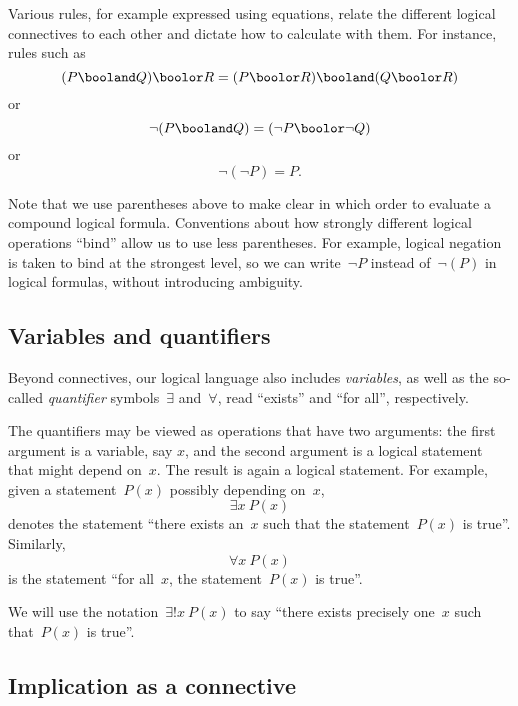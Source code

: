 Various rules, for example expressed using equations, relate the different logical connectives to each other and dictate how to calculate with them.
For instance, rules such as
\begin{equation*}
    (P \booland Q) \boolor R = (P \boolor R) \booland (Q \boolor R)
\end{equation*}
or 
\begin{equation*}
     \lnot (P \booland Q)  = (\lnot P \boolor \lnot Q)
\end{equation*}
or 
\begin{equation*}
    \lnot (\lnot P) = P.
\end{equation*}

Note that we use parentheses above to make clear in which order to evaluate a compound logical formula.
Conventions about how strongly different logical operations ``bind'' allow us to use less parentheses.
For example, logical negation is taken to bind at the strongest level, so we can write~$\lnot P$ instead of~$\lnot (P)$ in logical formulas, without introducing ambiguity.

\subsection{Variables and quantifiers}

Beyond connectives, our logical language also includes \emph{variables}, as well as the so-called \emph{quantifier} symbols~$\exists$ and~$\forall$, read ``exists'' and ``for all'', respectively.

The quantifiers may be viewed as operations that have two arguments: the first argument is a variable, say $x$, and the second argument is a logical statement that might depend on~$x$.
The result is again a logical statement.
For example, given a statement~$P(x)$ possibly depending on~$x$,
\begin{equation*}
\exists x \ P(x)
\end{equation*}
denotes the statement ``there exists an~$x$ such that the statement~$P(x)$ is true''.
Similarly,
\begin{equation*}
\forall x \ P(x)
\end{equation*}
is the statement ``for all~$x$, the statement~$P(x)$ is true''.

We will use the notation~$\exists!
    x \ P(x)$ to say ``there exists precisely one~$x$ such that~$P(x)$ is true''.


\subsection{Implication as a connective}

